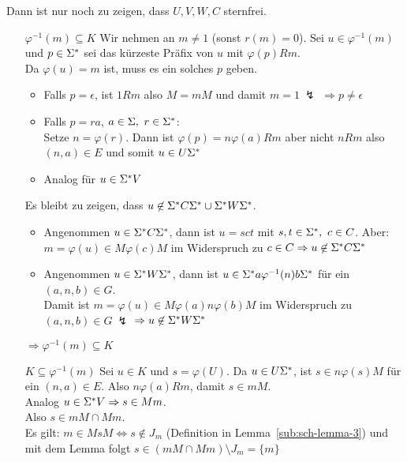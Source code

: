 \begin{itemize}
\begin{itemize}
        \end{itemize}
        Dann ist nur noch zu zeigen, dass $U,V,W,C$ sternfrei.
        \begin{itemize}
            \item[$\varphi^{-1}(m)\subseteq K$] Wir nehmen an $m\not=1$ (sonst $r(m)=0$). Sei $u\in\varphi^{-1}(m)$ und $p\in\Sigma^*$ sei das kürzeste Präfix von $u$ mit $\varphi(p)Rm$.\\
            Da $\varphi(u)=m$ ist, muss es ein solches $p$ geben.
            \begin{itemize}
                \item Falls $p=\epsilon$, ist $1Rm$ also $M=mM$ und damit $m=1\ \lightning$ $\Rightarrow p\not=\epsilon$
                \item Falls $p=ra$, $a\in\Sigma,\ r\in\Sigma^*$:\\
                Setze $n=\varphi(r)$. Dann ist $\varphi(p)=n\varphi(a)Rm$ aber nicht $nRm$ also $(n,a)\in E$ und somit $u\in U\Sigma^*$
                \item Analog für $u\in\Sigma^* V$
            \end{itemize}
            Es bleibt zu zeigen, dass $u\not\in \Sigma^* C\Sigma^*\cup \Sigma^* W\Sigma^*$.
            \begin{itemize}
                \item Angenommen $u\in\Sigma^* C\Sigma^*$, dann ist $u=sct$ mit $s,t\in\Sigma^*,\ c\in C$. Aber: $m=\varphi(u)\in M\varphi(c)M$ im Widerspruch zu $c\in C \Rightarrow u\not\in \Sigma^* C\Sigma^*$
                \item  Angenommen $u\in\Sigma^* W\Sigma^*$, dann ist $u\in\Sigma^* a\varphi^{-1}(n)b\Sigma^*$ für ein $(a,n,b)\in G$.\\
            Damit ist $m=\varphi(u)\in M \varphi(a)n\varphi(b)M$ im Widerspruch zu $(a,n,b)\in G\ \lightning$ $\Rightarrow u\not\in\Sigma^* W\Sigma^*$
            \end{itemize}
            $\Rightarrow \varphi^{-1}(m)\subseteq K$
            \item[$K\subseteq\varphi^{-1}(m)$] Sei $u\in K$ und $s=\varphi(U)$. Da $u\in U\Sigma^*$, ist $s\in n\varphi(s)M$ für ein $(n,a)\in E$. Also $n\varphi(a)Rm$, damit $s\in mM$.\\
            Analog $u\in\Sigma^* V\Rightarrow s\in Mm$.\\
            Also $s\in mM\cap Mm$.\\
            Es gilt: $m\in MsM\Leftrightarrow s\not\in J_m$ (Definition in Lemma~\ref{sub:sch-lemma-3}) und mit dem Lemma folgt $s\in(mM\cap Mm)\setminus J_m=\{m\}$\\

\end{itemize}
\end{itemize}
